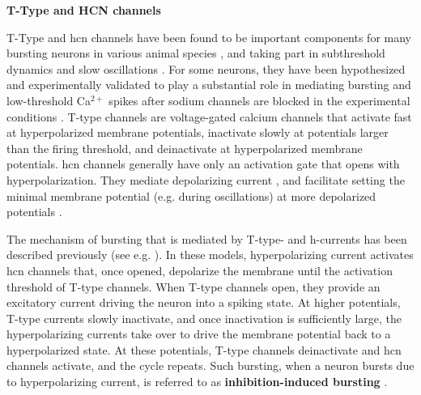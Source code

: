 \documentclass[../main.tex]{subfiles}
\begin{document}
\noindent\textbf{T-Type and HCN channels}

T-Type and \gls{hcn} channels have been found to be important components for many bursting neurons in various animal species \parencite{amarilloInterplaySevenSubthreshold2014,vickstromTTypeCalciumChannels2020,destexheModelInwardCurrent1993},
and taking part in subthreshold dynamics and slow oscillations \parencite{wangMultipleDynamicalModes1994}.
For some neurons, they have been hypothesized and experimentally validated to play a substantial role in mediating bursting and low-threshold Ca$^{2+}$ spikes after sodium channels are blocked in the experimental conditions \parencite{mccormickModelElectrophysiologicalProperties1992,liuMultipleConductancesCooperatively2008,vickstromTTypeCalciumChannels2020,suzukiTtypeCalciumChannels1989}.
T-type channels are voltage-gated calcium channels that activate fast at hyperpolarized membrane potentials, inactivate slowly at potentials larger than the firing threshold, and deinactivate at hyperpolarized membrane potentials. \gls{hcn} channels generally have only an activation gate that opens with hyperpolarization. They mediate depolarizing current \parencite{destexheModelInwardCurrent1993}, and facilitate setting the minimal membrane potential (e.g. during oscillations) at more depolarized potentials \parencite{liuMultipleConductancesCooperatively2008}.

The mechanism of bursting that is mediated by T-type- and h-currents has been described previously (see e.g. \parencite{liuMultipleConductancesCooperatively2008,wangMultipleDynamicalModes1994}). In these models, hyperpolarizing current activates \gls{hcn} channels that, once opened, depolarize the membrane until the activation threshold of T-type channels. When T-type channels open, they provide an excitatory current driving the neuron into a spiking state.
At higher potentials, T-type currents slowly inactivate, and once inactivation is sufficiently large, the hyperpolarizing currents take over to drive the membrane potential back to a hyperpolarized state.
At these potentials, T-type channels deinactivate and \gls{hcn} channels activate, and the cycle repeats. Such bursting, when a neuron bursts due to hyperpolarizing current, is referred to as \textbf{inhibition-induced bursting} \parencite{izhikevichDynamicalSystemsNeuroscience2006}.
\end{document}
